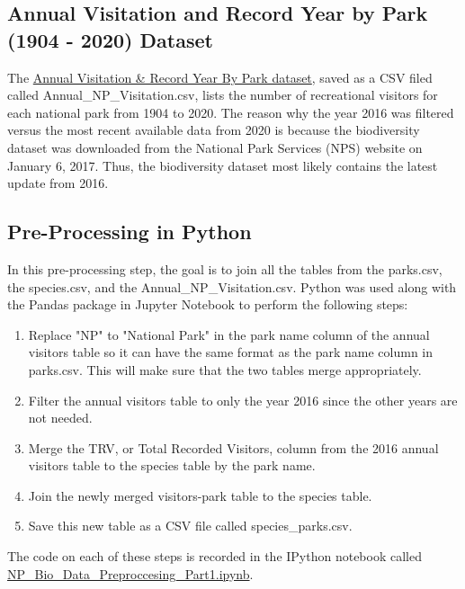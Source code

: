 \documentclass[stu, floatsintext, 11pt]{apa7}
\begin{document}
\subsection{Annual Visitation and Record Year by Park (1904 - 2020) Dataset}
The \href{https://irma.nps.gov/STATS/SSRSReports/National\%20Reports/Annual\%20Visitation\%20and\%20Record\%20Year\%20by\%20Park\%20(1904\%20-\%20Last\%20Calendar\%20Year}{Annual Visitation \& Record Year By Park dataset}, saved as a CSV filed called Annual\_NP\_Visitation.csv, lists the number of recreational visitors for each national park from 1904 to 2020. The reason why the year 2016 was filtered versus the most recent available data from 2020 is because the biodiversity dataset was downloaded from the National Park Services (NPS) website on January 6, 2017. Thus, the biodiversity dataset most likely contains the latest update from 2016.

\subsection{Pre-Processing in Python}
In this pre-processing step, the goal is to join all the tables from the parks.csv, the species.csv, and the Annual\_NP\_Visitation.csv. Python was used along with the Pandas package in Jupyter Notebook to perform the following steps:
\begin{enumerate}
    \item Replace "NP" to "National Park" in the park name column of the annual visitors table so it can have the same format as the park name column in parks.csv. This will make sure that the two tables merge appropriately.
    \item Filter the annual visitors table to only the year 2016 since the other years are not needed.
    \item Merge the TRV, or Total Recorded Visitors, column from the 2016 annual visitors table to the species table by the park name.
    \item Join the newly merged visitors-park table to the species table.
    \item Save this new table as a CSV file called species\_parks.csv.
\end{enumerate}

The code on each of these steps is recorded in the IPython notebook called \href{https://github.com/ohkaaaaay/NP_Biodiversity/blob/main/NP_Bio_Data_Preproccesing_Part1.ipynb}{NP\_Bio\_Data\_Preproccesing\_Part1.ipynb}.\\
\end{document}
